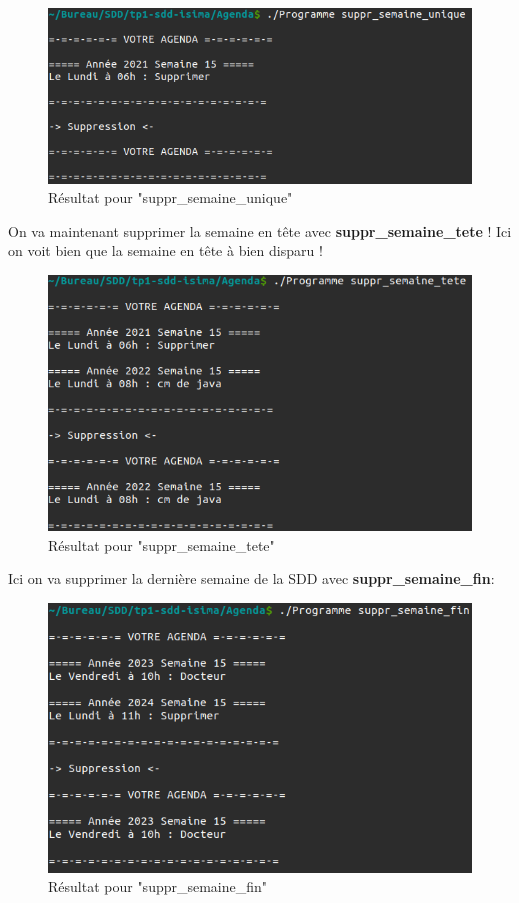 \documentclass[12pt,french]{article} %
\begin{document}
\begin{figure}[H]
	\includegraphics[scale=0.6]{su-su.png}
	\centering
	\caption{Résultat pour "suppr\_semaine\_unique"}
\end{figure}

On va maintenant supprimer la semaine en tête avec \textbf{suppr\_semaine\_tete} ! Ici on voit bien que la semaine en tête à bien disparu ! \newline

\begin{figure}[H]
	\includegraphics[scale=0.6]{su-st.png}
	\centering
	\caption{Résultat pour "suppr\_semaine\_tete"}
\end{figure}

Ici on va supprimer la dernière semaine de la SDD avec \textbf{suppr\_semaine\_fin}:\newline

\begin{figure}[H]
	\includegraphics[scale=0.6]{su-sf.png}
	\centering
	\caption{Résultat pour "suppr\_semaine\_fin"}
\end{figure}
\end{document}
